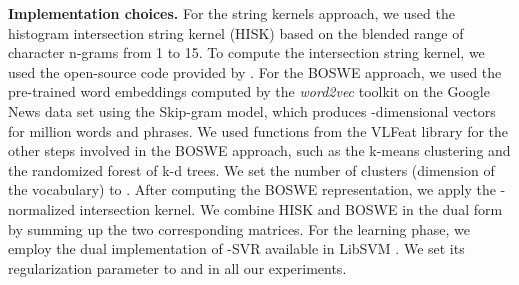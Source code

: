 \documentclass[11pt,a4paper]{article}
\begin{document}
\noindent
{\bf Implementation choices.}
For the string kernels approach, we used the histogram intersection string kernel (HISK) based on the blended range of character n-grams from 1 to 15. To compute the intersection string kernel, we used the open-source code provided by . For the BOSWE approach, we used the pre-trained word embeddings computed by the \emph{word2vec} toolkit \cite{Mikolov-NIPS-2013} on the Google News data set using the Skip-gram model, which produces -dimensional vectors for  million words and phrases. We used functions from the VLFeat library \cite{vedaldi-vlfeat-2008} for the other steps involved in the BOSWE approach, such as the k-means clustering and the randomized forest of k-d trees. We set the number of clusters (dimension of the vocabulary) to . After computing the BOSWE representation, we apply the -normalized intersection kernel. We combine HISK and BOSWE in the dual form by summing up the two corresponding matrices. For the learning phase, we employ the dual implementation of -SVR available in LibSVM \cite{LibSVM-2011}. We set its regularization parameter to  and  in all our experiments.
\end{document}

